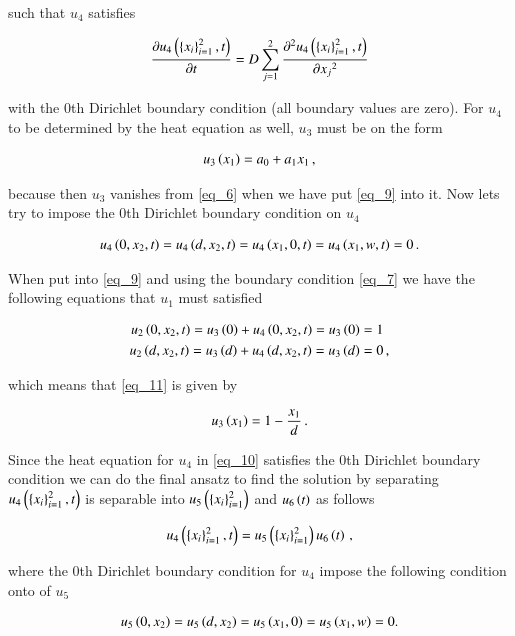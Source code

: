 \documentclass[11pt,english,a4paper]{article}
\begin{document}
\begin{flushleft}
such that $u_4$ satisfies

\begin{align}
\frac{\partial u_4\left({\left\lbrace{x_i}\right\rbrace_{i=1}^2,t}\right)}{\partial t} = D\sum_{j=1}^2\frac{\partial^2 u_4\left({\left\lbrace{x_i}\right\rbrace_{i=1}^2,t}\right)}{\partial {x_j}^2}
\label{eq_10}
\end{align}

with the 0th Dirichlet boundary condition (all boundary values are zero). For $u_4$ to be determined by the heat equation as well, $u_3$ must be on the form

\begin{align}
u_3\left({x_1}\right) = a_0 + a_1 x_1 \,,
\label{eq_11}
\end{align}

because then $u_3$ vanishes from \eqref{eq_6} when we have put \eqref{eq_9} into it. Now lets try to impose the 0th Dirichlet boundary condition on $u_4$

\begin{align}
u_4\left({0,x_2,t}\right)=u_4\left({d,x_2,t}\right)=u_4\left({x_1,0,t}\right)=u_4\left({x_1,w,t}\right)=0\,.
\label{eq_12}
\end{align}

When put into \eqref{eq_9} and using the boundary condition \eqref{eq_7} we have the following equations that $u_1$ must satisfied

\begin{align*}
u_2\left({0,x_2,t}\right) = u_3\left({0}\right) + u_4\left({0,x_2,t}\right) = u_3\left({0}\right) &= 1
\\
u_2\left({d,x_2,t}\right) = u_3\left({d}\right) + u_4\left({d,x_2,t}\right) = u_3\left({d}\right) &= 0\,,
\end{align*}

which means that \eqref{eq_11} is given by 

\begin{align}
u_3\left({x_1}\right) = 1 - \frac{x_1}{d} \,.
\label{eq_13}
\end{align}

Since the heat equation for $u_4$ in \eqref{eq_10} satisfies the 0th Dirichlet boundary condition we can do the final ansatz to find the solution by separating $u_4\left({\left\lbrace{x_i}\right\rbrace_{i=1}^2,t}\right)$ is separable into $u_5\left({\left\lbrace{x_i}\right\rbrace_{i=1}^2}\right)$ and $u_6\left({t}\right)$ as follows

\begin{align}
u_4\left({\left\lbrace{x_i}\right\rbrace_{i=1}^2,t}\right) = u_5\left({\left\lbrace{x_i}\right\rbrace_{i=1}^2}\right)u_6\left({t}\right) \,,
\label{eq_14}
\end{align}

where the 0th Dirichlet boundary condition for $u_4$ impose the following condition onto of $u_5$

\begin{align*}
u_5\left({0,x_2}\right)=u_5\left({d,x_2}\right)=u_5\left({x_1,0}\right)=u_5\left({x_1,w}\right)=0.
\end{align*}


\end{flushleft}
\end{document}
